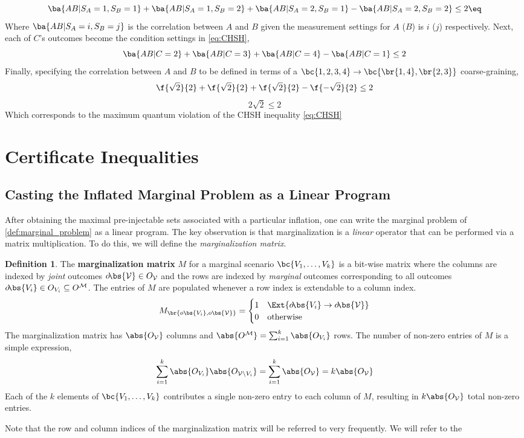 \documentclass[aps, 10pt, english, twoside, pra, nofootinbib, longbibliography]{revtex4-1}
\theoremstyle{plain}
\theoremstyle{definition}
\newtheorem{definition}[theorem]{Definition}
\theoremstyle{remark}
\newcommand{\term}[1]{\textcolor{Mahogany}{\textbf{#1}}}
\newcommand{\outc}[1]{o\!\bs{#1}}
\begin{document}
    \[ \ba{AB|S_A=1, S_B=1} + \ba{AB|S_A=1, S_B=2} + \ba{AB|S_A=2, S_B=1} - \ba{AB|S_A=2, S_B=2} \leq 2 \eq \label{eq:CHSH}\]
    Where $\ba{AB|S_A=i, S_B=j}$ is the correlation between $A$ and $B$ given the measurement settings for $A$ ($B$) is $i$ ($j$) respectively. Next, each of $C$'s outcomes become the condition settings in \cref{eq:CHSH},
    \[ \ba{AB|C=2} + \ba{AB|C=3} + \ba{AB|C=4} - \ba{AB|C=1} \leq 2 \]
    Finally, specifying the correlation between $A$ and $B$ to be defined in terms of a $\bc{1,2,3,4} \rightarrow \bc{\br{1,4}, \br{2,3}}$ coarse-graining,
    \[ \f{\sqrt{2}}{2} + \f{\sqrt{2}}{2} + \f{\sqrt{2}}{2} - \f{-\sqrt{2}}{2} \leq 2 \]
    \[ 2\sqrt{2} \leq 2 \]
    Which corresponds to the maximum quantum violation of the CHSH inequality \cref{eq:CHSH}

    \section{Certificate Inequalities}
    \subsection{Casting the Inflated Marginal Problem as a Linear Program}
    After obtaining the maximal pre-injectable sets associated with a particular inflation, one can write the marginal problem of \cref{def:marginal_problem} as a linear program. The key observation is that marginalization is a \textit{linear} operator that can be performed via a matrix multiplication. To do this, we will define the \textit{marginalization matrix}.
    \begin{definition}
        The \term{marginalization matrix} $M$ for a marginal scenario $\bc{V_1, \dots, V_k}$ is a bit-wise matrix where the columns are indexed by \textit{joint} outcomes $\outc{\mathcal{V}} \in O_{\mathcal{V}}$ and the rows are indexed by \textit{marginal} outcomes corresponding to all outcomes $\outc{V_i} \in O_{V_i} \subseteq O^{\mathcal{M}}$. The entries of $M$ are populated whenever a row index is extendable to a column index.
        \[ M_{\br{o\bs{V_i}, o\bs{\mathcal{V}}}} = \begin{cases}
            1 & \Ext{\outc{V_i} \to \outc{\mathcal{V}}} \\
            0 & \text{otherwise}
        \end{cases} \]
        The marginalization matrix has $\abs{O_\mathcal{V}}$ columns and $\abs{O^{\mathcal{M}}} = \sum_{i=1}^{k} \abs{O_{V_i}}$ rows. The number of non-zero entries of $M$ is a simple expression,
        \[ \sum_{i=1}^{k} \abs{O_{V_i}}\abs{O_{\mathcal{V} \setminus V_i}} = \sum_{i=1}^{k} \abs{O_{\mathcal{V}}} = k\abs{O_{\mathcal{V}}} \]
        Each of the $k$ elements of $\bc{V_1, \ldots, V_k}$ contributes a single non-zero entry to each column of $M$, resulting in $k\abs{O_\mathcal{V}}$ total non-zero entries.

        Note that the row and column indices of the marginalization matrix will be referred to very frequently. We will refer to the
    \end{definition}
\end{document}
